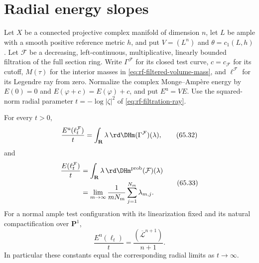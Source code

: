 \section{Radial energy slopes}
\label{sec:rf-energy-slopes}

Let $X$ be a connected projective complex manifold of dimension $n$, let $L$ be ample with a smooth positive reference metric $h$, and put $V=(L^n)$ and $\theta=c_1(L,h)$. Let $\mathcal F$ be a decreasing, left-continuous, multiplicative, linearly bounded filtration of the full section ring. Write $\Gamma^{\mathcal F}$ for its closed test curve, $c=c_{\mathcal F}$ for its cutoff, $M(\tau)$ for the interior masses in \eqref{eq:rf-filtered-volume-mass}, and $\ell^{\mathcal F}$ for its Legendre ray from zero. Normalize the complex Monge--Amp\`ere energy by $E(0)=0$ and $E(\varphi+c)=E(\varphi)+c$, and put $E^{\mathrm u}=VE$. Use the squared-norm radial parameter $t=-\log|\zeta|^2$ of \eqref{eq:rf-filtration-ray}.

\noindent\begin{minipage}{\linewidth}
\begin{theorem}\label{thm:rf-energy-slope}
For every $t>0$,
\[
 \frac{E^{\mathrm u}(\ell_t^{\mathcal F})}{t}
 =\int_{\mathbf R}\lambda\,
          \rd\DHm(\Gamma^{\mathcal F})(\lambda),
\tag{65.32}\label{eq:rf-energy-first-moment}
\]
and
\[
 \begin{aligned}
 \frac{E(\ell_t^{\mathcal F})}{t}
 &=\int_{\mathbf R}\lambda\,
          \rd\DHm^{\mathrm{prob}}(\mathcal F)(\lambda)\\
 &=\lim_{m\to\infty}\frac1{mN_m}\sum_{j=1}^{N_m}\lambda_{m,j}.
 \end{aligned}
\tag{65.33}\label{eq:rf-normalized-energy-slope}
\]
For a normal ample test configuration with its linearization fixed and its natural compactification over $\mathbf P^1$,
\[
 \frac{E^{\mathrm u}(\ell_t)}t
 =\frac{(\overline{\mathcal L}^{n+1})}{n+1}.
\tag{65.34}\label{eq:rf-energy-intersection-slope}
\]
In particular these constants equal the corresponding radial limits as $t\to\infty$.
\end{theorem}
\end{minipage}\par

